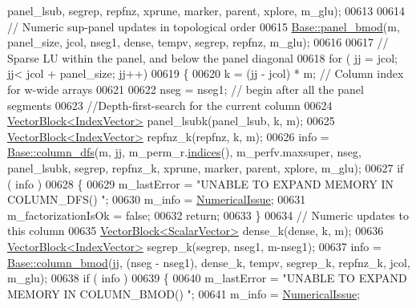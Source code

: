 \begin{DoxyCode}
      panel\_lsub, segrep, repfnz, xprune, marker, parent, xplore, m\_glu); 
00613     
00614     \textcolor{comment}{// Numeric sup-panel updates in topological order }
00615     \hyperlink{group___sparse_l_u___module_a277936738db49e25285164ac25c498c3}{Base::panel\_bmod}(m, panel\_size, jcol, nseg1, dense, tempv, segrep, repfnz, m\_glu); 
00616     
00617     \textcolor{comment}{// Sparse LU within the panel, and below the panel diagonal }
00618     \textcolor{keywordflow}{for} ( jj = jcol; jj< jcol + panel\_size; jj++) 
00619     \{
00620       k = (jj - jcol) * m; \textcolor{comment}{// Column index for w-wide arrays }
00621       
00622       nseg = nseg1; \textcolor{comment}{// begin after all the panel segments}
00623       \textcolor{comment}{//Depth-first-search for the current column}
00624       \hyperlink{group___core___module_class_eigen_1_1_vector_block}{VectorBlock<IndexVector>} panel\_lsubk(panel\_lsub, k, m);
00625       \hyperlink{group___core___module_class_eigen_1_1_vector_block}{VectorBlock<IndexVector>} repfnz\_k(repfnz, k, m); 
00626       info = \hyperlink{group___sparse_l_u___module_a6f543ae02eb6467e9bcc1e5cec8ccdd2}{Base::column\_dfs}(m, jj, m\_perm\_r.\hyperlink{group___core___module_a2f1ab379207fcd1ceb33941e25cf50c2}{indices}(), m\_perfv.maxsuper, nseg, 
      panel\_lsubk, segrep, repfnz\_k, xprune, marker, parent, xplore, m\_glu); 
00627       \textcolor{keywordflow}{if} ( info ) 
00628       \{
00629         m\_lastError =  \textcolor{stringliteral}{"UNABLE TO EXPAND MEMORY IN COLUMN\_DFS() "};
00630         m\_info = \hyperlink{group__enums_gga85fad7b87587764e5cf6b513a9e0ee5eaaf9b736d310a664e7729d163a035cc5f}{NumericalIssue}; 
00631         m\_factorizationIsOk = \textcolor{keyword}{false}; 
00632         \textcolor{keywordflow}{return}; 
00633       \}
00634       \textcolor{comment}{// Numeric updates to this column }
00635       \hyperlink{group___core___module_class_eigen_1_1_vector_block}{VectorBlock<ScalarVector>} dense\_k(dense, k, m); 
00636       \hyperlink{group___core___module_class_eigen_1_1_vector_block}{VectorBlock<IndexVector>} segrep\_k(segrep, nseg1, m-nseg1); 
00637       info = \hyperlink{group___sparse_l_u___module_ae34275602cf12560edfcaf7cd5cbe932}{Base::column\_bmod}(jj, (nseg - nseg1), dense\_k, tempv, segrep\_k, repfnz\_k, 
      jcol, m\_glu); 
00638       \textcolor{keywordflow}{if} ( info ) 
00639       \{
00640         m\_lastError = \textcolor{stringliteral}{"UNABLE TO EXPAND MEMORY IN COLUMN\_BMOD() "};
00641         m\_info = \hyperlink{group__enums_gga85fad7b87587764e5cf6b513a9e0ee5eaaf9b736d310a664e7729d163a035cc5f}{NumericalIssue}; 

\end{DoxyCode}
